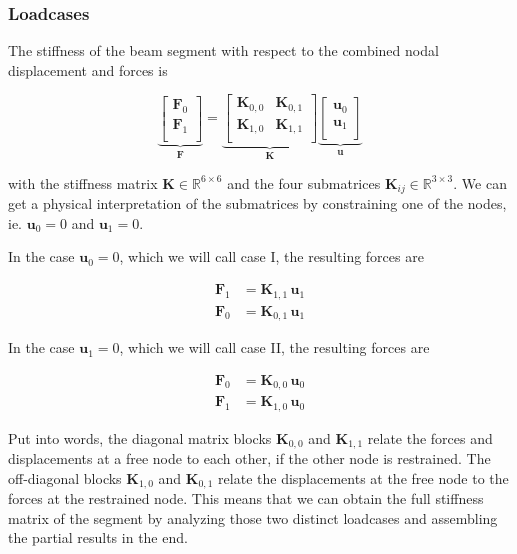 \subsubsection*{Loadcases}

The stiffness of the beam segment with respect to the combined nodal displacement and forces is

\begin{equation}
\underbrace{
\begin{bmatrix}
\boldsymbol{F}_0 \\
\boldsymbol{F}_1 \\
\end{bmatrix}
}_{\boldsymbol{F}}
=
\underbrace{
\begin{bmatrix}
\boldsymbol{K}_{0,0} & \boldsymbol{K}_{0,1} \\
\boldsymbol{K}_{1,0} & \boldsymbol{K}_{1,1} \\
\end{bmatrix}
}_{\boldsymbol{K}}
\underbrace{
\begin{bmatrix}
\boldsymbol{u}_0 \\
\boldsymbol{u}_1 \\
\end{bmatrix}
}_{\boldsymbol{u}}
\end{equation}

with the stiffness matrix $\boldsymbol{K} \in \mathbb{R}^{6 \times 6}$ and the four submatrices $\boldsymbol{K}_{ij} \in \mathbb{R}^{3 \times 3}$.
We can get a physical interpretation of the submatrices by constraining one of the nodes, ie. $\boldsymbol{u}_{0} = 0$ and $\boldsymbol{u}_{1} = 0$.

In the case $\boldsymbol{u}_{0} = 0$, which we will call case I, the resulting forces are

\begin{align}
\boldsymbol{F}_1 &= \boldsymbol{K}_{1,1}\,\boldsymbol{u}_1 \\
\boldsymbol{F}_0 &= \boldsymbol{K}_{0,1}\,\boldsymbol{u}_1
\end{align}

In the case $\boldsymbol{u}_{1} = 0$, which we will call case II, the resulting forces are

\begin{align}
\boldsymbol{F}_0 &= \boldsymbol{K}_{0,0}\,\boldsymbol{u}_0 \\
\boldsymbol{F}_1 &= \boldsymbol{K}_{1,0}\,\boldsymbol{u}_0
\end{align}

Put into words, the diagonal matrix blocks $\boldsymbol{K}_{0,0}$ and $\boldsymbol{K}_{1,1}$ relate the forces and displacements at a free node to each other, if the other node is restrained.
The off-diagonal blocks $\boldsymbol{K}_{1,0}$ and $\boldsymbol{K}_{0,1}$ relate the displacements at the free node to the forces at the restrained node.
This means that we can obtain the full stiffness matrix of the segment by analyzing those two distinct loadcases and assembling the partial results in the end.

